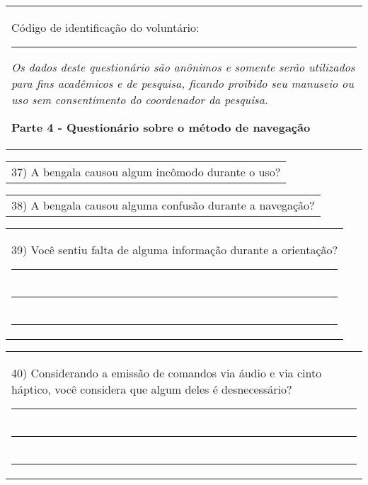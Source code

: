 \begin{table}[!thb]
    \begin{tabular}{m{1\linewidth}}

        {\color{gray}
        
        Código de identificação do voluntário: \rule{1in}{.2mm}
        
        \textit{Os dados deste questionário são anônimos e somente serão utilizados para fins acadêmicos e de pesquisa, ficando proibido seu manuseio ou uso sem consentimento do coordenador da pesquisa.}
        }
        
        \begin{center}
        \textbf{Parte 4 - Questionário sobre o método de navegação}
        \end{center}
        
    \end{tabular}
%

    \begin{tabular}{m{1\linewidth}}
        \vspace{1ex}
        37)	A bengala causou algum incômodo durante o uso?
    \end{tabular}

    
    

    \begin{tabular}{m{1\linewidth}}
        \vspace{1ex}
        38)	A bengala causou alguma confusão durante a navegação?
    \end{tabular}

    
    

    \begin{tabular}{m{1\linewidth}}
        \vspace{1ex}
        39)	Você sentiu falta de alguma informação durante a orientação?

        \noindent
        \rule{6in}{.2mm} \\
        \rule{6in}{.2mm} \\
        \rule{6in}{.2mm}

    \end{tabular}

    \begin{tabular}{m{1\linewidth}}
        40)	Considerando a emissão de comandos via áudio e via cinto háptico, você considera que algum deles é desnecessário?

        \noindent
        \rule{6in}{.2mm} \\
        \rule{6in}{.2mm} \\
        \rule{6in}{.2mm}

    \end{tabular}
\end{table}

